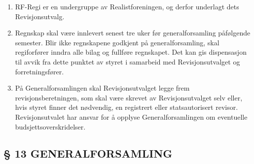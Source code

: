 \documentclass[a4paper,11pt,norsk]{scrartcl}
\begin{document}
\begin{enumerate}
\renewcommand{\labelenumi}{\alph{enumi})}
\item RF-Regi er en undergruppe av Realistforeningen, og derfor underlagt dets
Revisjonsutvalg.

\item Regnskap skal være innlevert senest tre uker før generalforsamling påfølgende
semester. Blir ikke regnskapene godkjent på generalforsamling, skal
regiforfører inndra alle bilag og fullføre regnskapet. Det kan gis dispensasjon
til avvik fra dette punktet av styret i samarbeid med Revisjonsutvalget og forretningsfører.

\item På Generalforsamlingen skal Revisjonsutvalget legge frem revisjonsberetningen,
som skal være skrevet av Revisjonsutvalget selv eller, hvis styret finner det
nødvendig, en registrert eller statsautorisert revisor. Revisjonsutvalet
har ansvar for å opplyse Generalforsamlingen om eventuelle budsjettsoverskridelser.
\end{enumerate}


\subsection{§ 13 GENERALFORSAMLING%
  \label{generalforsamling}%
}
\end{document}
